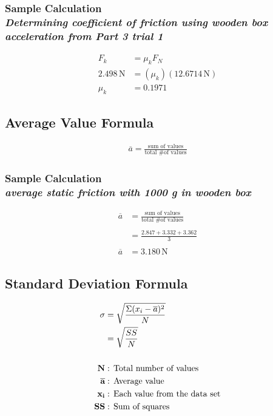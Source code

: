 \subsubsection{Sample Calculation \\ {\normalfont \small\textit{Determining coefficient of friction using wooden box acceleration from Part 3 trial 1}}}

{\centering
\begin{align*}
	F_k &= \mu_k F_N \\
	2.498\,\text{N} &= (\mu_k)(12.6714\,\text{N}) \\
	\mu_k &= \boxed{0.1971}
\end{align*}}


\newpage

\subsection{Average Value Formula} 

\begin{align*}
	\overline{a} = \frac{\text{sum of values}}{\text{total \# of values}} 
\end{align*}

\subsubsection{Sample Calculation \\ {\normalfont \small\textit{average static friction with 1000 g in wooden box}}}


\begin{align*}
	\overline{a}&=\frac{\text{sum of values}}{\text{total \# of values}} \\ \\
							&= \frac{2.847+3.332+3.362}{3} \\ \\
	\overline{a}&= \boxed{3.180\,\text{N}}
\end{align*}

\subsection{Standard Deviation Formula}

\begin{align*}
		\sigma &= \sqrt{\frac{\Sigma(x_i -\overline{a})^2}{N}} \\
		 &= \sqrt{\frac{SS}{N}} \\ \\
		\textbf{N} &:\, \text{Total number of values} \\
		\overline{\textbf{a}} &:\, \text{Average value} \\
		\textbf{x\textsubscript{i}} &:\, \text{Each value from the data set} \\
		\textbf{SS} &:\, \text{Sum of squares} 
\end{align*}

